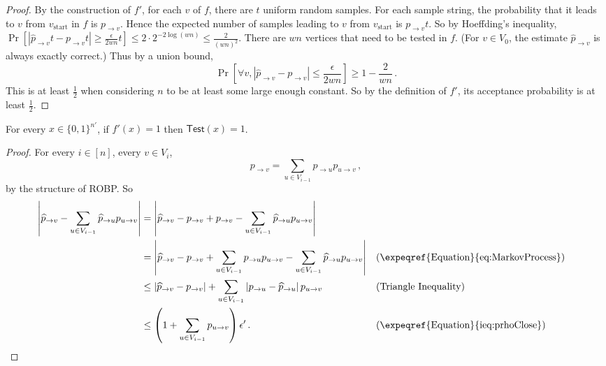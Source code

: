 \documentclass{toc}
\begin{document}
\begin{proof}
By the construction of $f'$, for each $v$ of $f$, there are $t$ uniform random samples. For each sample string, the probability that it leads to $v$ from $v_{\text{start}}$ in $f$ is $ p_{\to v} $. Hence the expected number of samples leading to $v$ from $v_{\text{start}}$ is $  p_{\to v}  t $. So by Hoeffding's inequality, $\Pr[|\widehat{p}_{\to v}t - p_{\to v} t| \geq \frac{\epsilon}{2wn} t ] \leq 2 \cdot 2^{-2 \log(wn)}\leq \frac{2}{(wn)^2}$. There are $w n $ vertices that need to be tested in $f$. (For $v \in V_0$, the estimate $\widehat{p}_{\to v}$ is always exactly correct.) Thus by a union bound, 
\[ \Pr\left[ \forall v, \left| \widehat{p}_{\to v}  -  p_{\to v} \right| \leq  \frac{\epsilon}{2wn} \right] \geq 1 - \frac{2}{ wn }\,. \]
This is at least $\frac{1}{2}$ when considering $n$ to be at least some large enough constant. So by the definition of $f'$, its acceptance probability is at least $\frac{1}{2}$.
\end{proof}

\begin{lemma} \label{lem:somexPassTest}
For every $x \in \{0, 1\}^{n'}$, if $ f'(x) = 1 $ then $\mathsf{Test}(x) = 1$.
\end{lemma}

\begin{proof}
For every $i\in [n]$, every $v\in V_{i}$,  
\begin{equation} \label{eq:MarkovProcess}
p_{\to v}  = \sum_{u\in V_{i-1}}  p_{\to u} p_{u \to v}\,,
\end{equation}
by the structure of ROBP. So
\begin{align*}
\left| \widehat{p}_{\to v} -  \sum_{u\in V_{i-1}}  \widehat{p}_{\to u} p_{u \to v} \right|
&= \left| \widehat{p}_{\to v} - p_{\to v} + p_{\to v}  -   \sum_{u\in V_{i-1}} \widehat{p}_{\to u} p_{u \to v}   \right| \\
&=\left| \widehat{p}_{\to v} - p_{\to v} + \sum_{u\in V_{i-1}} p_{\to u} p_{u\to v} - \sum_{u\in V_{i-1}}  \widehat{p}_{\to u} p_{u \to v} \right|
&& (\text{\expeqref{Equation}{eq:MarkovProcess}}) \\
&\leq \left| \widehat{p}_{\to v} - p_{\to v} \right| +    \sum_{u \in V_{i-1} } \left| p_{\to u}-\widehat{p}_{\to u} \right| p_{u \to v}   
&& (\text{Triangle Inequality}) \\
&\leq \left( 1 + \sum_{u\in V_{i-1}}p_{u\to v} \right) \epsilon'\,. 
&& (\text{\expeqref{Equation}{ieq:prhoClose}}) \qedhere
\end{align*}
\end{proof}
\end{document}
